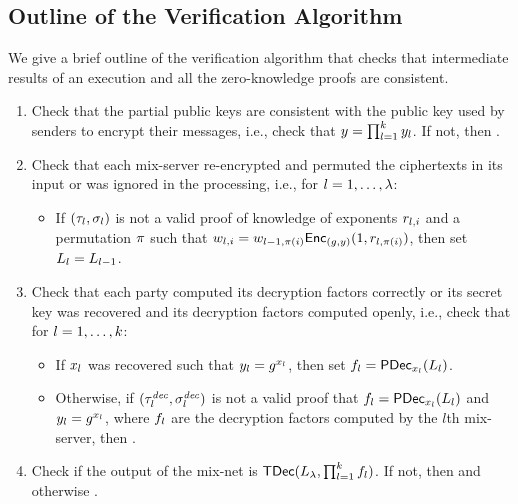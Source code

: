 \documentclass[11pt]{article}
\begin{document}
\subsection{Outline of the Verification Algorithm}\label{sect:outlineverify}

We give a brief outline of the verification algorithm that checks that
intermediate results of an execution and all the zero-knowledge proofs
are consistent.

\begin{enumerate}

\item Check that the partial public keys are consistent with the
  public key used by senders to encrypt their messages, i.e., check
  that $y=\prod_{l=1}^{k}y_{l}$. If not, then \reject.

\item Check that each mix-server re-encrypted and permuted the
  ciphertexts in its input or was ignored in the processing, i.e., for
  $l=1,\ldots,\lambda$:
  \begin{itemize}

  \item If $(\tau_{l},\sigma_{l})$ is not a valid proof of knowledge
    of exponents $r_{l,i}$ and a permutation $\pi$ such that
    $w_{l,i}=w_{l-1,\pi(i)}\textsf{Enc}_{(g,y)}(1,r_{l,\pi(i)})$,
    then set $L_{l}=L_{l-1}$.

  \end{itemize}

\item Check that each party computed its decryption factors correctly
  or its secret key was recovered and its decryption factors computed
  openly, i.e., check that for $l=1,\ldots,k$:
  \begin{itemize}

  \item If $x_{l}$ was recovered such that $y_{l}=g^{x_{l}}$, then
    set $f_{l}=\textsf{PDec}_{x_{l}}(L_{l})$.

  \item Otherwise, if $(\tau_{l}^{\mathit{dec}},\sigma_{l}^{\mathit{dec}})$ is not a valid proof
    that $f_{l}=\textsf{PDec}_{x_{l}}(L_{l})$ and
    $y_{l}=g^{x_{l}}$, where $f_{l}$ are the decryption
    factors computed by the $l$th mix-server, then \reject.

  \end{itemize}

\item Check if the output of the mix-net is
  $\textsf{TDec}(L_{\lambda},\prod_{l=1}^{k}f_{l})$. If not, then
  \reject and otherwise \accept.

\end{enumerate}
\end{document}
